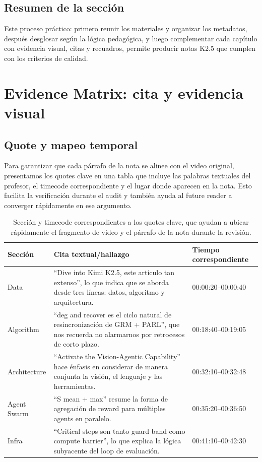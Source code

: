 \documentclass[a4paper]{article}
\begin{document}
\subsection{Resumen de la sección}
Este proceso práctico: primero reunir los materiales y organizar los metadatos, después desglosar según la lógica pedagógica, y luego complementar cada capítulo con evidencia visual, citas y recuadros, permite producir notas K2.5 que cumplen con los criterios de calidad.
\section{Evidence Matrix: cita y evidencia visual}

\subsection{Quote y mapeo temporal}
\label{sec:evidence-quotes}
Para garantizar que cada párrafo de la nota se alinee con el video original, presentamos los quotes clave en una tabla que incluye las palabras textuales del profesor, el timecode correspondiente y el lugar donde aparecen en la nota. Esto facilita la verificación durante el audit y también ayuda al future reader a converger rápidamente en ese argumento.

\begin{table}[H]
\footnotesize
\centering
\begin{tabular}{p{3cm}p{4cm}p{5cm}}
\toprule
Sección & Cita textual/hallazgo & Tiempo correspondiente \\
\midrule
Data & ``Dive into Kimi K2.5, este artículo tan extenso'', lo que indica que se aborda desde tres líneas: datos, algoritmo y arquitectura. & 00:00:20--00:00:40 \\
Algorithm & ``deg and recover es el ciclo natural de resincronización de GRM + PARL'', que nos recuerda no alarmarnos por retrocesos de corto plazo. & 00:18:40--00:19:05 \\
Architecture & ``Activate the Vision-Agentic Capability'' hace énfasis en considerar de manera conjunta la visión, el lenguaje y las herramientas. & 00:32:10--00:32:48 \\
Agent Swarm & ``S mean + max'' resume la forma de agregación de reward para múltiples agents en paralelo. & 00:35:20--00:36:50 \\
Infra & ``Critical steps son tanto guard band como compute barrier'', lo que explica la lógica subyacente del loop de evaluación. & 00:41:10--00:42:30 \\
\bottomrule
\end{tabular}
\caption{Sección y timecode correspondientes a los quotes clave, que ayudan a ubicar rápidamente el fragmento de video y el párrafo de la nota durante la revisión.}
\end{table}
\end{document}
